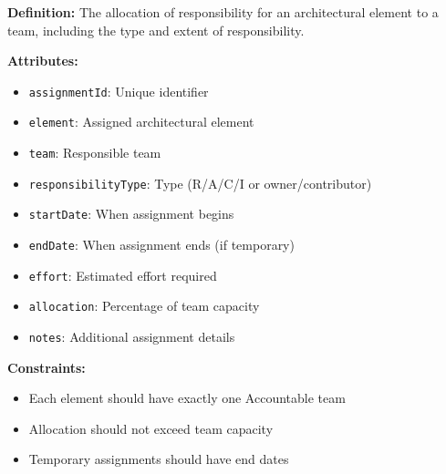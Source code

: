\documentclass[11pt,letterpaper]{article}
\begin{document}
\begin{definitionbox}
\textbf{Definition:} The allocation of responsibility for an architectural element to a team, including the type and extent of responsibility.

\textbf{Attributes:}
\begin{itemize}[nosep]
    \item \texttt{assignmentId}: Unique identifier
    \item \texttt{element}: Assigned architectural element
    \item \texttt{team}: Responsible team
    \item \texttt{responsibilityType}: Type (R/A/C/I or owner/contributor)
    \item \texttt{startDate}: When assignment begins
    \item \texttt{endDate}: When assignment ends (if temporary)
    \item \texttt{effort}: Estimated effort required
    \item \texttt{allocation}: Percentage of team capacity
    \item \texttt{notes}: Additional assignment details
\end{itemize}

\textbf{Constraints:}
\begin{itemize}[nosep]
    \item Each element should have exactly one Accountable team
    \item Allocation should not exceed team capacity
    \item Temporary assignments should have end dates
\end{itemize}
\end{definitionbox}
\end{document}
